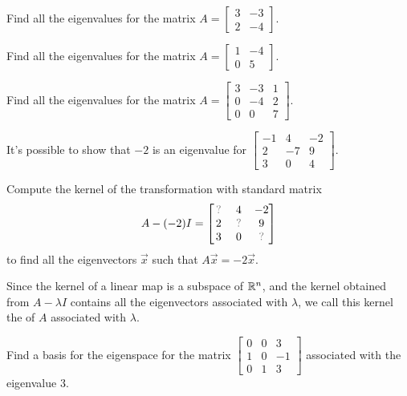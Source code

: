 \begin{activity}{5}
  Find all the eigenvalues for the matrix
  $A=\begin{bmatrix} 3 & -3 \\ 2 & -4 \end{bmatrix}$.
\end{activity}

\begin{activity}{5}
  Find all the eigenvalues for the matrix
  $A=\begin{bmatrix} 1 & -4 \\ 0 & 5 \end{bmatrix}$.
\end{activity}

\begin{activity}{10}
  Find all the eigenvalues for the matrix
  $A=\begin{bmatrix} 3 & -3 & 1 \\ 0 & -4 & 2 \\ 0 & 0 & 7 \end{bmatrix}$.
\end{activity}




\begin{activity}{10}
It's possible to show that \(-2\) is an eigenvalue for
\(\begin{bmatrix}-1&4&-2\\2&-7&9\\3&0&4\end{bmatrix}\).

\vspace{1em}

Compute the kernel of the transformation with standard matrix
\[
  A-(-2)I
    =
  \begin{bmatrix} \unknown & 4&-2 \\ 2 & \unknown & 9\\3&0&\unknown \end{bmatrix}
\] 
to find all the eigenvectors \(\vec x\) such that \(A\vec x=-2\vec x\).
\end{activity}

\begin{definition}
  Since the kernel of a linear map is a subspace
  of \(\mathbb{R}^n\), and the kernel obtained from \(A-\lambda I\)
  contains all the eigenvectors associated with \(\lambda\),
  we call this kernel the  of \(A\) associated with \(\lambda\).
\end{definition}

\begin{activity}{10}
Find a basis for the eigenspace for the matrix
\(
  \begin{bmatrix}
    0 & 0 & 3 \\ 1 & 0 & -1 \\ 0 & 1 & 3
  \end{bmatrix}
\)
associated with the eigenvalue \(3\).
\end{activity}

